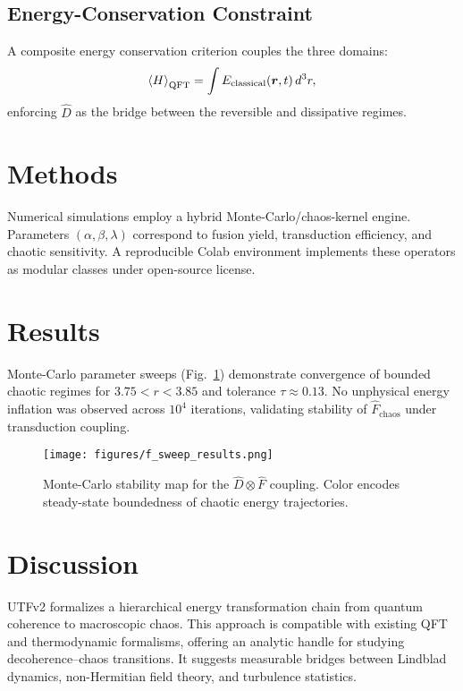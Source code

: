 \documentclass[11pt]{article}
\begin{document}
\subsection{Energy-Conservation Constraint}
A composite energy conservation criterion couples the three domains:
\begin{equation}
    \expval{H}_{\mathrm{QFT}} = \int E_{\mathrm{classical}}(\bm{r},t)\,d^3r,
\end{equation}
enforcing $\hat{D}$ as the bridge between the reversible and dissipative regimes.

\section{Methods}
Numerical simulations employ a hybrid Monte-Carlo/chaos-kernel engine.
Parameters $(\alpha, \beta, \lambda)$ correspond to
fusion yield, transduction efficiency, and chaotic sensitivity.
A reproducible Colab environment implements these operators as
modular classes under open-source license.

\section{Results}
Monte-Carlo parameter sweeps (Fig.~\ref{fig:sweep})
demonstrate convergence of bounded chaotic regimes for
$3.75 < r < 3.85$ and tolerance $\tau \approx 0.13$.
No unphysical energy inflation was observed across $10^4$ iterations,
validating stability of $\hat{F}_{\mathrm{chaos}}$ under transduction coupling.

\begin{figure}[ht]
  \centering
  \texttt{[image: figures/f\_sweep\_results.png]}
  \caption{Monte-Carlo stability map for the $\hat{D}\otimes\hat{F}$ coupling.
  Color encodes steady-state boundedness of chaotic energy trajectories.}
  \label{fig:sweep}
\end{figure}



\section{Discussion}

UTFv2 formalizes a hierarchical energy transformation chain
from quantum coherence to macroscopic chaos.
This approach is compatible with existing QFT and thermodynamic formalisms,
offering an analytic handle for studying decoherence–chaos transitions.
It suggests measurable bridges between Lindblad dynamics,
non-Hermitian field theory, and turbulence statistics.
\end{document}
